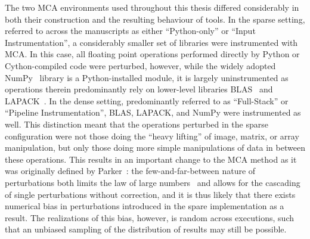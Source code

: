 The two MCA environments used throughout this thesis differed considerably in both their construction and the
resulting behaviour of tools. In the sparse setting, referred to across the manuscripts as either ``Python-only''
or ``Input Instrumentation'', a considerably smaller set of libraries were instrumented with MCA. In this case,
all floating point operations performed directly by Python or Cython-compiled code were perturbed, however, while
the widely adopted NumPy~\cite{harris2020array} library is a Python-installed module, it is largely
uninstrumented as operations therein predominantly rely on lower-level libraries BLAS~\cite{lawson1979basic} and
LAPACK~\cite{anderson1999lapack}. In the dense setting, predominantly referred to as ``Full-Stack'' or ``Pipeline
Instrumentation'', BLAS, LAPACK, and NumPy were instrumented as well. This distinction meant that the operations
perturbed in the sparse configuration were not those doing the ``heavy lifting'' of image, matrix, or array
manipulation, but only those doing more simple manipulations of data in between these operations. This results in
an important change to the MCA method as it was originally defined by Parker~\cite{Parker1997-qq}: the
few-and-far-between nature of perturbations both limits the law of large numbers~\cite{hsu1947complete} and
allows for the cascading of single perturbations without correction, and it is thus likely that there exists
numerical bias in perturbations introduced in the spare implementation as a result. The realizations of this bias,
however, is random across executions, such that an unbiased sampling of the distribution of results may still be
possible.

